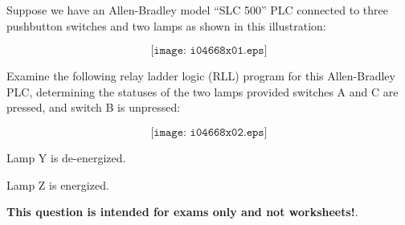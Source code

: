 

Suppose we have an Allen-Bradley model ``SLC 500'' PLC connected to three pushbutton switches and two lamps as shown in this illustration:

$$\texttt{[image: i04668x01.eps]}$$

Examine the following relay ladder logic (RLL) program for this Allen-Bradley PLC, determining the statuses of the two lamps provided switches A and C are pressed, and switch B is unpressed:

$$\texttt{[image: i04668x02.eps]}$$







Lamp Y is de-energized.

\vskip 10pt

Lamp Z is energized.







{\bf This question is intended for exams only and not worksheets!}.




